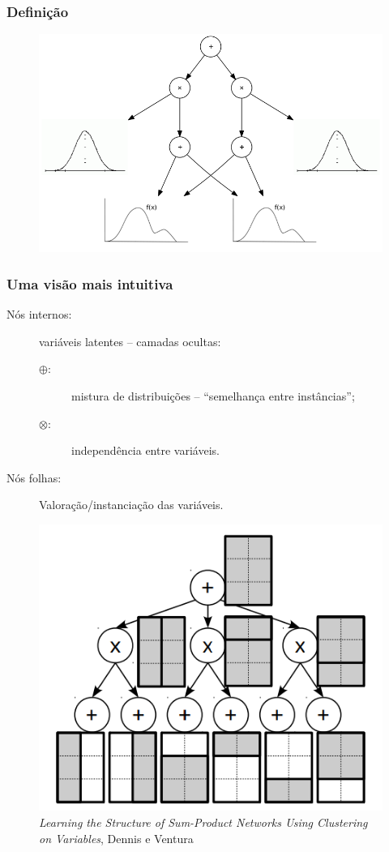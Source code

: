 \documentclass[10pt]{beamer}
\theoremstyle{plain}
\newcommand{\p}{\pause}
\begin{document}
\begin{frame}
  \frametitle{Definição}
  \begin{figure}[h]
    \centering\includegraphics[scale=0.3]{graphs/alt_spn.png}
  \end{figure}
\end{frame}

\begin{frame}
  \frametitle{Uma visão mais intuitiva}
  \begin{description}
    \item[Nós internos:] variáveis latentes -- camadas ocultas:
    \begin{description}
      \item[$\oplus$:] mistura de distribuições -- ``semelhança entre instâncias'';
      \item[$\otimes$:] independência entre variáveis.
    \end{description}
    \item[Nós folhas:] Valoração/instanciação das variáveis.
  \end{description}\p
  \begin{figure}[h]
    \centering\includegraphics[scale=0.25]{imgs/img_spn.png}
    \caption{\textit{Learning the Structure of Sum-Product Networks Using Clustering on Variables},
      Dennis e Ventura~\cite{clustering}}
  \end{figure}
\end{frame}
\end{document}
